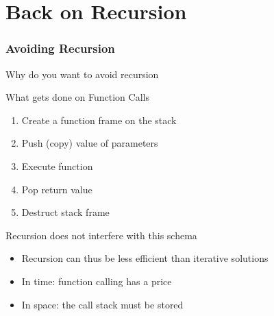 \part{Back on Recursion}
\label{derecurs}\mypartpage
\section{Avoiding Recursion}
\begin{frame}{Why do you want to avoid recursion}
  \begin{block}{What gets done on Function Calls}
    \begin{enumerate}
    \item Create a function frame on the stack
    \item Push (copy) value of parameters
    \item Execute function
    \item Pop return value
    \item Destruct stack frame
    \end{enumerate}
  \end{block}
  
  \begin{block}{Recursion does not interfere with this schema}
    \begin{itemize}
    \item Recursion can thus be less efficient than iterative solutions
    \item In time: function calling has a price
    \item In space: the call stack must be stored
    \end{itemize}
  \end{block}
\end{frame}
